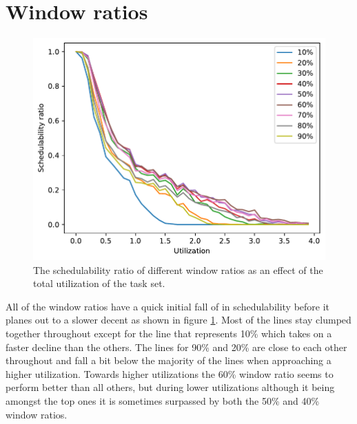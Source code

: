 \documentclass{kththesis}
\begin{document}
\section{Window ratios}\label{sec:result_window_ratios}

\begin{figure}

    \centering

    \includegraphics[width=0.8\linewidth]{images/window_ratio.pdf}

    \caption{The schedulability ratio of different window ratios as an effect of the total
        utilization of the task set.}

    \label{fig:window_ratio}

\end{figure}

All of the window ratios have a quick initial fall of in schedulability before it planes out to a
slower decent as shown in figure \ref{fig:window_ratio}. Most of the lines stay clumped together
throughout except for the line that represents 10\% which takes on a faster decline than the others. The lines for 90\% and
20\% are close to each other throughout and fall a bit below the majority of the lines when
approaching a higher utilization. Towards higher utilizations the 60\% window ratio seems to perform
better than all others, but during lower utilizations although it being amongst the top ones it is
sometimes surpassed by both the 50\% and 40\% window ratios.
\end{document}
